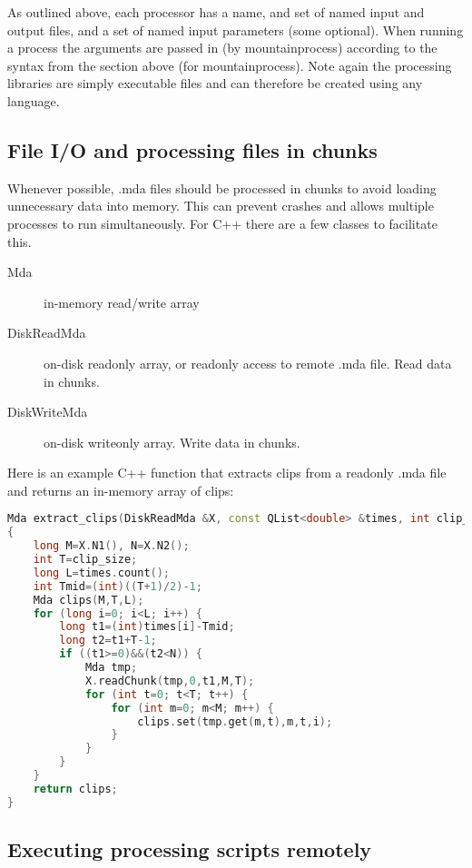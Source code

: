 \documentclass{article}
\begin{document}
As outlined above, each processor has a name, and set of named input and output files, and a set of named input parameters (some optional). When running a process the arguments are passed in (by mountainprocess) according to the syntax from the section above (for mountainprocess). Note again the processing libraries are simply executable files and can therefore be created using any language.


\subsection{File I/O and processing files in chunks}

Whenever possible, .mda files should be processed in chunks to avoid loading unnecessary data into memory. This can prevent crashes and allows multiple processes to run simultaneously. For C++ there are a few classes to facilitate this.

\begin{description}
\item[Mda] in-memory read/write array
\item[DiskReadMda] on-disk readonly array, or readonly access to remote .mda file. Read data in chunks.
\item[DiskWriteMda] on-disk writeonly array. Write data in chunks.
\end{description}

Here is an example C++ function that extracts clips from a readonly .mda file and returns an in-memory array of clips:
\begin{lstlisting}[language=C++]
Mda extract_clips(DiskReadMda &X, const QList<double> &times, int clip_size)
{
    long M=X.N1(), N=X.N2();
    int T=clip_size;
    long L=times.count();
    int Tmid=(int)((T+1)/2)-1;
    Mda clips(M,T,L);
    for (long i=0; i<L; i++) {
        long t1=(int)times[i]-Tmid;
        long t2=t1+T-1;
        if ((t1>=0)&&(t2<N)) {
            Mda tmp;
            X.readChunk(tmp,0,t1,M,T);
            for (int t=0; t<T; t++) {
                for (int m=0; m<M; m++) {
                    clips.set(tmp.get(m,t),m,t,i);
                }
            }
        }
    }
    return clips;
}
\end{lstlisting}

\subsection{Executing processing scripts remotely}
\end{document}
